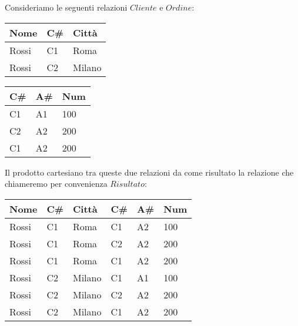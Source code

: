 \begin{exmp}
 Consideriamo le seguenti relazioni $Cliente$ e $Ordine$:
 \begin{center}
 \begin{multicols}{2}

 \begin{tabular}{l | l | l}
  Nome & C\# & Città\\
  \hline
  Rossi & C1 & Roma\\
  Rossi & C2 & Milano\\
 \end{tabular}
 
 \begin{tabular}{l | l | l}
  C\# & A\# & Num \\
  \hline
  C1 & A1 & 100\\
  C2 & A2 & 200\\
  C1 & A2 & 200\\
 \end{tabular}

\end{multicols}
\end{center}

Il prodotto cartesiano tra queste due relazioni da come risultato la relazione
che chiameremo per convenienza $Risultato$:

\begin{center}
 \begin{tabular}{l|l|l|l|l|l}
  Nome & C\# & Città & C\# & A\# & Num\\
  \hline
  Rossi & C1 & Roma & C1 & A2 & 100\\
  Rossi & C1 & Roma & C2 & A2 & 200\\
  Rossi & C1 & Roma & C1 & A2 & 200\\
  Rossi & C2 & Milano & C1 & A1 & 100\\
  Rossi & C2 & Milano & C2 & A2 & 200\\
  Rossi & C2 & Milano & C1 & A2 & 200\\
 \end{tabular}

\end{center}

\end{exmp}

